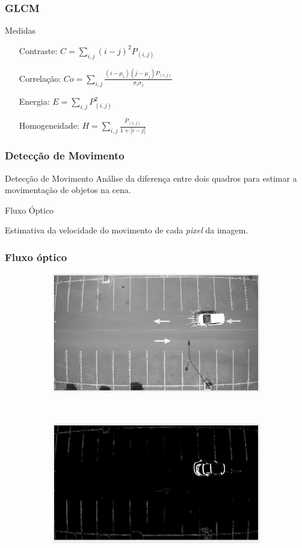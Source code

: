 \documentclass{beamer}
\begin{document}
\begin{frame}
\frametitle{GLCM}
\begin{block}{Medidas}
\begin{itemize}
\centering
\item[Contraste:] $C = \sum_{i,j} (i-j)^{2}P_{(i,j)}$
\item[Correlação:] $Co = \sum_{i,j} \frac{(i - \mu_i)(j - \mu_j)P_{(i,j)}}{\sigma_i\sigma_j}$
\item[Energia:]$E = \sum_{i,j} P_{(i,j)}^{2}$
\item[Homogeneidade:]$H = \sum_{i,j} \frac{P_{(i,j)}}{1+|i-j|}$
\centering
\end{itemize}
\end{block}
\end{frame}

\begin{frame}
\frametitle{Detecção de Movimento}
\begin{block}{Detecção de Movimento}
Análise da diferença entre dois quadros para estimar a movimentação de objetos na cena.
\end{block}
\begin{block}{Fluxo Óptico}
\item Estimativa da velocidade do movimento de cada \textit{pixel} da imagem.
\end{block}
\end{frame}

\begin{frame}
\frametitle{Fluxo óptico}
\begin{figure}
 \centering
\begin{subfigure}{.4\textwidth}
  \centering
  \includegraphics[width=.8\linewidth]{velocidadevetores}
	\caption{}
\end{subfigure}\
\begin{subfigure}{.4\textwidth}
  \centering
  \includegraphics[width=.8\linewidth]{velocidademagnitude}
	\caption{}
\end{subfigure}
\end{figure}
\end{frame}
\end{document}
